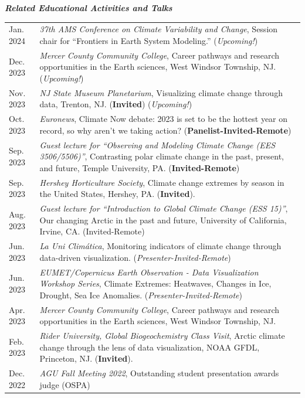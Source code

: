 \documentclass[margin,line,palatino,courier,10pt]{res}
\begin{document}
\begin{resume}
\textit{\textbf{Related Educational Activities and Talks}}
\vspace*{0.05in}\\
\begin{tabular}{@{}p{0.9in}p{4in}}
Jan. 2024 & \textit{37th AMS Conference on Climate Variability and Change}, Session chair for ``Frontiers in Earth System Modeling.'' (\textit{Upcoming!})\\ 
Dec. 2023 & \textit{Mercer County Community College}, Career pathways and research opportunities in the Earth sciences, West Windsor Township, NJ. (\textit{Upcoming!})\\ 
Nov. 2023 & \textit{NJ State Museum Planetarium}, Visualizing climate change through data, Trenton, NJ. (\textbf{Invited}) (\textit{Upcoming!})\\ 
Oct. 2023 & \textit{Euronews}, Climate Now debate: 2023 is set to be the hottest year on record, so why aren't we taking action? (\textbf{Panelist-Invited-Remote})\\
Sep. 2023 & \textit{Guest lecture for ``Observing and Modeling Climate Change (EES 3506/5506)''}, Contrasting polar climate change in the past, present, and future, Temple University, PA. (\textbf{Invited-Remote})\\
Sep. 2023 & \textit{Hershey Horticulture Society}, Climate change extremes by season in the United States, Hershey, PA. (\textbf{Invited}). \\
Aug. 2023 & \textit{Guest lecture for ``Introduction to Global Climate Change (ESS 15)''}, Our changing Arctic in the past and future, University of California, Irvine, CA. (Invited-Remote)\\
Jun. 2023 & \textit{La Uni Clim\'{a}tica}, Monitoring indicators of climate change through data-driven visualization. (\textit{Presenter-Invited-Remote})\\
Jun. 2023 & \textit{EUMET/Copernicus Earth Observation - Data Visualization Workshop Series}, Climate Extremes: Heatwaves, Changes in Ice, Drought, Sea Ice Anomalies. (\textit{Presenter-Invited-Remote})\\
Apr. 2023 & \textit{Mercer County Community College}, Career pathways and research opportunities in the Earth sciences, West Windsor Township, NJ.\\
Feb. 2023 & \textit{Rider University, Global Biogeochemistry Class Visit}, Arctic climate change through the lens of data visualization, NOAA GFDL, Princeton, NJ. (\textbf{Invited}).\\
Dec. 2022 & \textit{AGU Fall Meeting 2022}, Outstanding student presentation awards judge (OSPA)\\

\end{tabular}
\end{resume}
\end{document}

